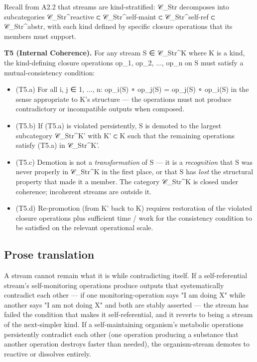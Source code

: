 \documentclass[11pt, openany]{book}
\begin{document}
Recall from A2.2 that streams are kind-stratified: 𝒞\_\allowbreak{}Str decomposes into subcategories 𝒞\_\allowbreak{}Str\textasciicircum{}reactive ⊂ 𝒞\_\allowbreak{}Str\textasciicircum{}self-maint ⊂ 𝒞\_\allowbreak{}Str\textasciicircum{}self-ref ⊂ 𝒞\_\allowbreak{}Str\textasciicircum{}abstr, with each kind defined by specific closure operations that its members must support.

\textbf{T5 (Internal Coherence).} For any stream S ∈ 𝒞\_\allowbreak{}Str\textasciicircum{}K where K is a kind, the kind-defining closure operations op\_\allowbreak{}1, op\_\allowbreak{}2, ..., op\_\allowbreak{}n on S must satisfy a mutual-consistency condition:

\begin{itemize}
\item (T5.a) For all i, j ∈ {1, ..., n}: op\_\allowbreak{}i(S) ∘ op\_\allowbreak{}j(S) = op\_\allowbreak{}j(S) ∘ op\_\allowbreak{}i(S) in the sense appropriate to K's structure --- the operations must not produce contradictory or incompatible outputs when composed.
\item (T5.b) If (T5.a) is violated persistently, S is demoted to the largest subcategory 𝒞\_\allowbreak{}Str\textasciicircum{}K' with K' ⊂ K such that the remaining operations satisfy (T5.a) in 𝒞\_\allowbreak{}Str\textasciicircum{}K'.
\item (T5.c) Demotion is not a \textit{transformation} of S --- it is a \textit{recognition} that S was never properly in 𝒞\_\allowbreak{}Str\textasciicircum{}K in the first place, or that S has \textit{lost} the structural property that made it a member. The category 𝒞\_\allowbreak{}Str\textasciicircum{}K is closed under coherence; incoherent streams are outside it.
\item (T5.d) Re-promotion (from K' back to K) requires restoration of the violated closure operations plus sufficient time / work for the consistency condition to be satisfied on the relevant operational scale.
\end{itemize}

\subsection{Prose translation}

A stream cannot remain what it is while contradicting itself. If a self-referential stream's self-monitoring operations produce outputs that systematically contradict each other --- if one monitoring-operation says "I am doing X" while another says "I am not doing X" and both are stably asserted --- the stream has failed the condition that makes it self-referential, and it reverts to being a stream of the next-simpler kind. If a self-maintaining organism's metabolic operations persistently contradict each other (one operation producing a substance that another operation destroys faster than needed), the organism-stream demotes to reactive or dissolves entirely.
\end{document}
